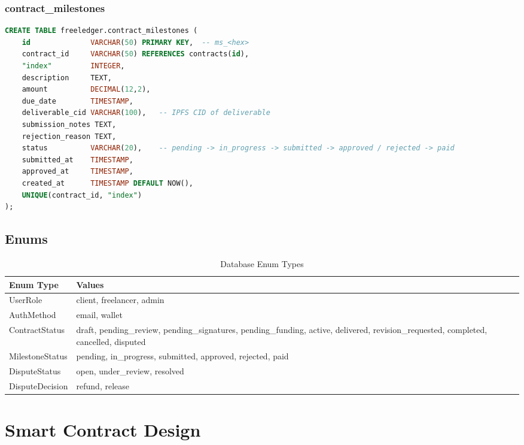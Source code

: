 \documentclass[12pt,a4paper]{article}
\begin{document}
\subsubsection{contract\_milestones}
\begin{lstlisting}[language=SQL, basicstyle=\ttfamily\scriptsize]
CREATE TABLE freeledger.contract_milestones (
    id              VARCHAR(50) PRIMARY KEY,  -- ms_<hex>
    contract_id     VARCHAR(50) REFERENCES contracts(id),
    "index"         INTEGER,
    description     TEXT,
    amount          DECIMAL(12,2),
    due_date        TIMESTAMP,
    deliverable_cid VARCHAR(100),   -- IPFS CID of deliverable
    submission_notes TEXT,
    rejection_reason TEXT,
    status          VARCHAR(20),    -- pending -> in_progress -> submitted -> approved / rejected -> paid
    submitted_at    TIMESTAMP,
    approved_at     TIMESTAMP,
    created_at      TIMESTAMP DEFAULT NOW(),
    UNIQUE(contract_id, "index")
);
\end{lstlisting}

\subsection{Enums}

\begin{table}[h]
\centering
\begin{tabular}{ll}
\toprule
\textbf{Enum Type} & \textbf{Values} \\
\midrule
UserRole & client, freelancer, admin \\
AuthMethod & email, wallet \\
ContractStatus & draft, pending\_review, pending\_signatures, pending\_funding, active, delivered, revision\_requested, completed, cancelled, disputed \\
MilestoneStatus & pending, in\_progress, submitted, approved, rejected, paid \\
DisputeStatus & open, under\_review, resolved \\
DisputeDecision & refund, release \\
\bottomrule
\end{tabular}
\caption{Database Enum Types}
\end{table}

\section{Smart Contract Design}
\end{document}
